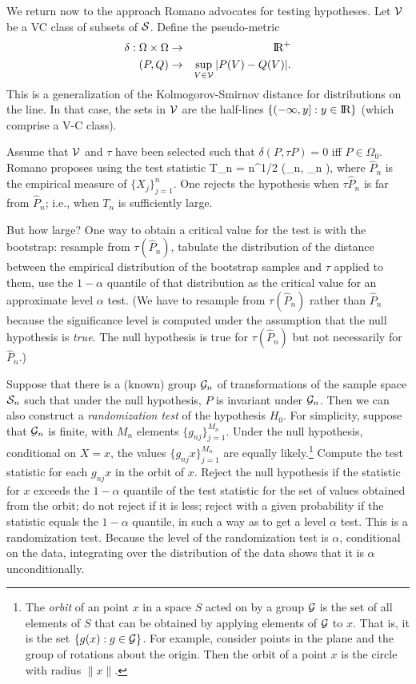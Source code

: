 We return now to the approach Romano advocates for testing hypotheses.
Let ${\cal V}$ be a VC
class of subsets of ${\cal S}$.
Define the pseudo-metric
\begin{eqnarray}
        \delta: \Omega \times \Omega &\rightarrow& \hbox{I\kern-.17em\hbox{R}}^+
        \nonumber \\
        (P, Q) & \rightarrow & \sup_{V \in {\cal V}} | P(V) - Q(V) | .
\end{eqnarray}
This is a generalization of the Kolmogorov-Smirnov distance for distributions on the
line.
In that case, the sets in ${\cal V}$ are the half-lines $\{(-\infty, y] : y \in \hbox{I\kern-.17em\hbox{R}}\}$
(which comprise a
V-C class).

Assume that ${\cal V}$ and $\tau$ have been selected such that
$\delta(P, \tau P) = 0$ iff
$P \in \Omega_0$.
Romano proposes using the test statistic
\beq
    T_n = n^{1/2} \delta(_n, \tau {}_n ),
\eeq
where $\hat{P}_n$ is the empirical measure of $\{X_j \}_{j=1}^n$.
One rejects the hypothesis when  $\tau\hat{P}_n$ is far from $\hat{P}_n$; i.e.,
when $T_n$ is sufficiently large.

But how large?
One way to obtain a critical value for the test is with the bootstrap:
resample from $\tau(\hat{P}_n)$, tabulate the distribution of the distance
between the empirical distribution of the bootstrap samples and $\tau$ applied to them,
use the $1-\alpha$ quantile of that distribution as the critical value for an
approximate level $\alpha$ test.
(We have to resample from $\tau(\hat{P}_n)$ rather than $\hat{P}_n$ because the
significance level is computed under the assumption that the null hypothesis is {\em true}\/.
The null hypothesis is true for $\tau(\hat{P}_n)$ but not necessarily for $\hat{P}_n$.)

Suppose that there is a (known) group ${\cal G}_n$ of transformations of the sample space
${\cal S}_n$
such that under the null hypothesis, $P$ is invariant under ${\cal G}_n$.
Then we can also construct a {\em randomization test} of the hypothesis $H_0$.
For simplicity, suppose that ${\cal G}_n$ is finite, with $M_n$ elements
$\{ g_{nj} \}_{j=1}^{M_n}$.
Under the null hypothesis, conditional on $X = x$, the values $\{ g_{nj}x \}_{j=1}^{M_n}$
are equally likely.\footnote{
	The {\em orbit} of an point $x$ in a space $S$ acted on by a group ${\cal G}$ is the set of
	all elements of $S$ that can be obtained by applying elements of ${\cal G}$ to $x$.
	That is, it is the set $\{ g(x): g \in {\cal G}\}$.
	For example, consider points in the plane and the group of rotations about the
	origin.
	Then the orbit of a point $x$ is the circle with radius $\|x\|$.
}
Compute the  test statistic for each $ g_{nj}x$ in the orbit of $x$.
Reject the null hypothesis if the statistic for $x$ exceeds the $1-\alpha$ quantile of
the test statistic for the set of values obtained from the orbit;
do not reject if it is less; reject with a given probability if the statistic equals
the $1-\alpha$ quantile, in such a way as to get a level $\alpha$ test.
This is a randomization test.
Because the level of the randomization test is $\alpha$, conditional on the data,
integrating
over the distribution of the data shows that it is $\alpha$ unconditionally.

